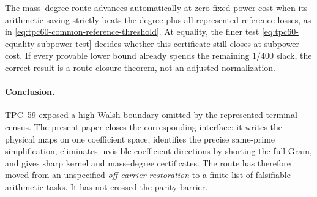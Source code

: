 The mass--degree route advances automatically at zero fixed-power cost when
its arithmetic saving strictly beats the degree plus all
represented-reference losses, as in
\eqref{eq:tpc60-common-reference-threshold}.  At equality, the finer test
\eqref{eq:tpc60-equality-subpower-test} decides whether this certificate
still closes at subpower cost.  If every provable lower bound already
spends the remaining \(1/400\) slack, the correct result is a route-closure
theorem, not an adjusted normalization.

\paragraph{Conclusion.}
TPC--59 exposed a high Walsh boundary omitted by the represented terminal
census.  The present paper closes the corresponding interface: it writes
the physical maps on one coefficient space, identifies the precise
same-prime simplification, eliminates invisible coefficient directions by
shorting the full Gram, and gives sharp kernel and mass--degree
certificates.  The route has therefore moved from an unspecified
\emph{off-carrier restoration} to a finite list of falsifiable arithmetic
tasks.  It has not crossed the parity barrier.
